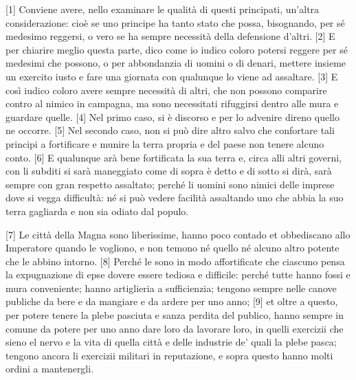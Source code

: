 {[}1{]} Conviene avere, nello examinare le qualità di questi principati,
un'altra considerazione: cioè se uno principe ha tanto stato che possa,
bisognando, per sé medesimo reggersi, o vero se ha sempre necessità
della defensione d'altri. {[}2{]} E per chiarire meglio questa parte,
dico come io iudico coloro potersi reggere per sé medesimi che possono,
o per abbondanzia di uomini o di denari, mettere insieme un exercito
iusto e fare una giornata con qualunque lo viene ad assaltare. {[}3{]} E
così iudico coloro avere sempre necessità di altri, che non possono
comparire contro al nimico in campagna, ma sono necessitati rifuggirsi
dentro alle mura e guardare quelle.
{[}4{]} Nel primo caso, si è discorso e per lo advenire direno quello ne
occorre. {[}5{]} Nel secondo caso, non si può dire altro salvo che
confortare tali principi a fortificare e munire la terra propria e del
paese non tenere alcuno conto. {[}6{]} E qualunque arà bene fortificata
la sua terra e, circa alli altri governi, con li subditi si sarà
maneggiato come di sopra è detto e di sotto si dirà, sarà sempre con
gran respetto assaltato; perché li uomini sono nimici delle imprese dove
si vegga difficultà: né si può vedere facilità assaltando uno che abbia
la suo terra gagliarda e non sia odiato dal populo.

\quebra

{[}7{]} Le città della Magna sono liberissime, hanno poco contado et
obbediscano allo Imperatore quando le vogliono, e non temono né quello
né alcuno altro potente che le abbino intorno. {[}8{]} Perché le sono in
modo affortificate che ciascuno pensa la expugnazione di epse dovere
essere tediosa e difficile: perché tutte hanno fossi e mura conveniente;
hanno artiglieria a sufficienzia; tengono sempre nelle canove publiche
da bere e da mangiare e da ardere per uno anno; {[}9{]} et oltre a
questo, per potere tenere la plebe pasciuta e sanza perdita del publico,
hanno sempre in comune da potere per uno anno dare loro da lavorare
loro, in quelli exercizii che sieno el nervo e la vita di quella città e
delle industrie de' quali la plebe pasca; tengono ancora li exercizii
militari in reputazione, e sopra questo hanno molti ordini a
mantenergli.


